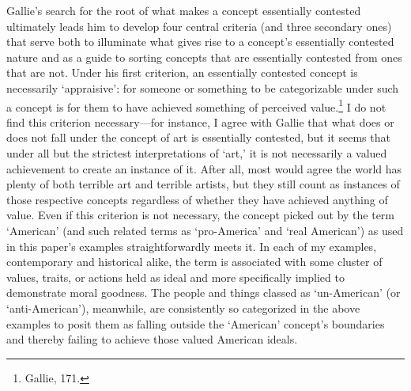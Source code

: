 Gallie's search for the root of what makes a concept essentially
contested ultimately leads him to develop four central criteria (and
three secondary ones) that serve both to illuminate what gives rise to a
concept's essentially contested nature and as a guide to sorting
concepts that are essentially contested from ones that are not. Under
his first criterion, an essentially contested concept is necessarily
`appraisive': for someone or something to be categorizable under such a
concept is for them to have achieved something of perceived
value.\footnote{Gallie, 171.} I do not find this criterion
necessary---for instance, I agree with Gallie that what does or does not
fall under the concept of art is essentially contested, but it seems
that under all but the strictest interpretations of `art,' it is not
necessarily a valued achievement to create an instance of it. After all,
most would agree the world has plenty of both terrible art and terrible
artists, but they still count as instances of those respective concepts
regardless of whether they have achieved anything of value. Even if this
criterion is not necessary, the concept picked out by the term
`American' (and such related terms as `pro-America' and `real American')
as used in this paper's examples straightforwardly meets it. In each of
my examples, contemporary and historical alike, the term is associated
with some cluster of values, traits, or actions held as ideal and more
specifically implied to demonstrate moral goodness. The people and
things classed as `un-American' (or `anti-American'), meanwhile, are
consistently so categorized in the above examples to posit them as
falling outside the `American' concept's boundaries and thereby failing
to achieve those valued American ideals.

